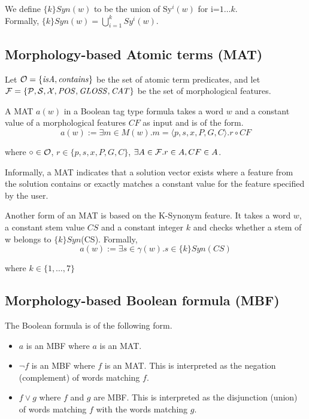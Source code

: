 We define $\{k\}Syn(w)$ to be the union of Sy$^{i}(w)$ for i=$1\dots k$.\\
Formally, $\{k\}Syn(w) = \bigcup\limits_{i=1}^{k} Sy^{i}(w)$.

\subsection{Morphology-based Atomic terms (MAT)}
Let ${\cal O} = \{ \mathit{isA}, \mathit{contains}\}$ be the set of atomic term 
predicates, and let ${\cal F} = \{ \pp, \ss, \xx, \PP, \GG, \AC\}$ be the 
set of morphological features. 

A MAT $a(w)$ in a Boolean tag type formula takes a word $w$ 
and a constant value of a morphological features $CF$ as input and is of the form. 
\[
  a(w) := \exists m \in M(w). m=\langle p,s,x,P,G,C\rangle. r \circ CF
\]

where $\circ \in {\cal O}$, 
$r \in \{p,s,x,P,G,C\}$, $\exists A \in{\cal F}.r\in A,CF \in A$.

Informally, a MAT indicates that a solution vector exists where 
a feature from the solution contains or exactly matches a constant value for the 
feature specified by the user. 

Another form of an MAT is based on the K-Synonym feature. 
It takes a word $w$, a constant stem value $CS$ and a constant integer $k$ and checks whether a stem of w belongs to $\{k\}Syn$(CS). Formally,
\[
  a(w) := \exists s\in \gamma(w).s\in \{k\}Syn(CS)
\]

where $k\in\{1,\dots,7\}$

\subsection{Morphology-based Boolean formula (MBF)}

The \framework Boolean formula is of the following form.
\begin{itemize}
  \item $a$ is an MBF where $a$ is an MAT.
  \item $\neg f$ is an MBF where $f$ is an MAT. This is interpreted
    as the negation (complement) of words matching $f$. 
  \item $f \vee g$ where $f$ and $g$ are MBF. This is interpreted as 
    the disjunction (union) of words matching $f$ with the words matching $g$. 
\end{itemize}

